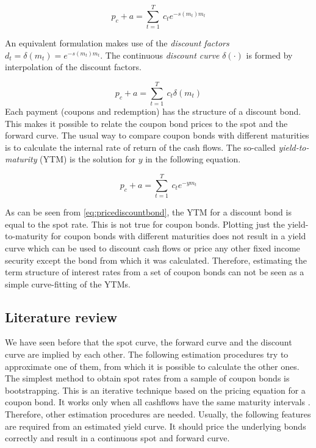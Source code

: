 \begin{equation}
  \label{bondpriceeq}
  p_c+a = \sum_{t=1}^T \ c_t e^{-s(m_t)m_t}
\end{equation}

An equivalent formulation makes use of the \emph{discount factors} $d_t=\delta(m_t)=e^{-s(m_t)m_t}$. The continuous \emph{discount curve} $\delta(\cdot)$ is formed by interpolation of the discount factors.


\begin{equation*}
  \label{bondprceq2}
  p_c+a=\sum_{t=1}^T \ c_t \delta(m_t) 
\end{equation*}
Each payment (coupons and redemption) has the structure of a discount bond. This makes it possible to relate the coupon bond prices to the spot and the forward curve. The usual way to compare coupon bonds with different maturities is to calculate the internal rate of return of the cash flows. The so-called \emph{yield-to-maturity} (YTM) is the solution for $y$ in the following equation.

\begin{equation}
   \label{eq:yield}
   p_c+a=\sum_{t=1}^T \ c_t e^{-ym_t}
 \end{equation}

As can be seen from \eqref{eq:pricediscountbond}, the YTM for a discount bond is equal to the spot rate. This is not true for coupon bonds. Plotting just the yield-to-maturity for coupon bonds with different maturities does not result in a yield curve which can be used to discount cash flows or price any other fixed income security except the bond from which it was calculated. Therefore, estimating the term structure of interest rates from a set of coupon bonds can not be seen as a simple curve-fitting of the YTMs.

\subsection{Literature review}

We have seen before that the spot curve, the forward curve and the discount curve are implied by each other. The following estimation procedures try to approximate one of them, from which it is possible to calculate the other ones. The simplest method to obtain spot rates from a sample of coupon bonds is bootstrapping. This is an iterative technique based on the pricing equation for a coupon bond. It works only when all cashflows have the same maturity intervals \citep[see, e.g.][]{Hagan2006}. Therefore, other estimation procedures are needed. Usually, the following features are required from an estimated yield curve. It should price the underlying bonds correctly and result in a continuous spot and forward curve. 

